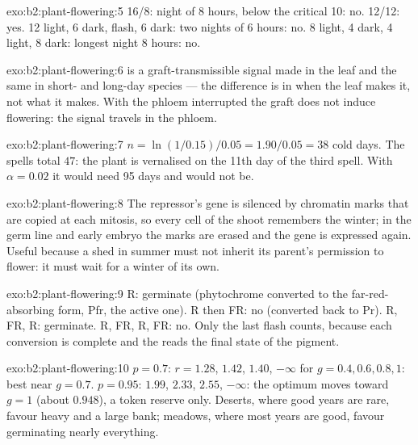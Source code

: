 \begin{solution}{exo:b2:plant-flowering:5}
16/8: night of 8 hours, below the critical 10: no. 12/12: yes.
12 light, 6 dark, flash, 6 dark: two nights of 6 hours: no.
8 light, 4 dark, 4 light, 8 dark: longest night 8 hours: no.
\end{solution}

\begin{solution}{exo:b2:plant-flowering:6}
 is a graft-transmissible signal made in the leaf and the
same in short- and long-day species --- the difference is in when
the leaf makes it, not what it makes. With the phloem interrupted
the graft does not induce flowering: the signal travels in the
phloem.
\end{solution}

\begin{solution}{exo:b2:plant-flowering:7}
$n = \ln(1/0.15)/0.05 = 1.90/0.05 = 38$ cold days. The spells total
$47$: the plant is vernalised on the 11th day of the third spell.
With $\alpha = 0.02$ it would need 95 days and would not be.
\end{solution}

\begin{solution}{exo:b2:plant-flowering:8}
The repressor's gene is silenced by chromatin marks that are copied
at each mitosis, so every cell of the shoot remembers the winter;
in the germ line and early embryo the marks are erased and the gene
is expressed again. Useful because a  shed in summer must not
inherit its parent's permission to flower: it must wait for a
winter of its own.
\end{solution}

\begin{solution}{exo:b2:plant-flowering:9}
R: germinate (phytochrome converted to the far-red-absorbing form,
Pfr, the active one). R then FR: no (converted back to Pr).
R, FR, R: germinate. R, FR, R, FR: no. Only the last flash counts,
because each conversion is complete and the  reads the final
state of the pigment.
\end{solution}

\begin{solution}{exo:b2:plant-flowering:10}
$p = 0.7$: $r = 1.28$, $1.42$, $1.40$, $-\infty$ for $g = 0.4, 0.6, 0.8,
1$: best near $g = 0.7$. $p = 0.95$: $1.99$, $2.33$, $2.55$,
$-\infty$: the optimum moves toward $g = 1$ (about $0.948$), a token
reserve only. Deserts, where good years are rare, favour heavy
 and a large  bank; meadows, where most years are good,
favour germinating nearly everything.
\end{solution}

